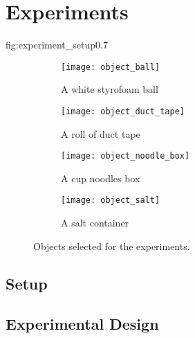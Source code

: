 
\chapter{Experiments}

{fig:experiment_setup}{0.7\textwidth}

\begin{figure}[htb]
    \centering
    \small
    \begin{subfigure}[b]{0.45\textwidth}
        \texttt{[image: object\_ball]}
        \caption{A white styrofoam ball}
        \label{fig:object_ball}
    \end{subfigure}
    \hfill
    \begin{subfigure}[b]{0.45\textwidth}
        \texttt{[image: object\_duct\_tape]}
        \caption{A roll of duct tape}
        \label{fig:object_duct_tape}
    \end{subfigure}
    
    \begin{subfigure}[b]{0.45\textwidth}
        \texttt{[image: object\_noodle\_box]}
        \caption{A cup noodles box}
        \label{fig:object_noodle_box}
    \end{subfigure}
    \hfill
    \begin{subfigure}[b]{0.45\textwidth}
        \texttt{[image: object\_salt]}
        \caption{A salt container}
        \label{fig:object_salt}
    \end{subfigure}
    \caption{Objects selected for the experiments.}\label{fig:objects}
\end{figure}

\section{Setup}

\section{Experimental Design}
